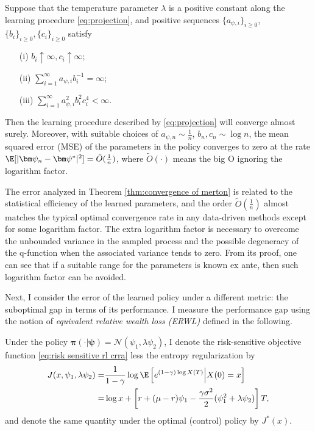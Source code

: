 \begin{theorem}
	\label{thm:convergence of merton}
	Suppose that the temperature parameter $\lambda$ is a positive constant along the learning procedure \eqref{eq:projection}, and positive sequences $\{a_{\psi,i}\}_{i\geq 0}$, $\{b_i\}_{i\geq 0},\{c_i\}_{i\geq 0}$ satisfy
	\begin{enumerate}
		\item[(i)] $b_{i}\uparrow \infty,c_i\uparrow \infty$;
		\item[(ii)] $\sum_{i=1}^{\infty}a_{\psi,i}b_i^{-1} = \infty$;
		\item[(iii)] $\sum_{i=1}^{\infty}a_{\psi,i}^2  b_i^{2}  c_i^4  < \infty$.
	\end{enumerate}
	Then the learning procedure described by \eqref{eq:projection} will converge almost surely. Moreover, with suitable choices of $a_{\psi,n} \sim \frac{1}{n}$, $b_n,c_n \sim \log n$, the mean squared error (MSE) of the parameters in the policy converges to zero at the rate $\E[|\bm \psi_{n} - \bm\psi^*|^2] =\tilde{O}(\frac{1}{n})$, where $\tilde{O}(\cdot)$ means the big O ignoring the logarithm factor.
\end{theorem}

The error analyzed in Theorem \ref{thm:convergence of merton} is related to the statistical efficiency of the learned parameters, and the order $\tilde{O}(\frac{1}{n})$ almost matches the typical optimal convergence rate in any data-driven methods except for some logarithm factor. The extra logarithm factor is necessary to overcome the unbounded variance in the sampled process and the possible degeneracy of the q-function when the associated variance tends to zero. From its proof, one can see that if a suitable range for the parameters is known ex ante, then such logarithm factor can be avoided.


Next, I consider the error of the learned policy under a different metric: the suboptimal gap in terms of its performance. I measure the performance gap using the notion of \textit{equivalent relative wealth loss (ERWL)} defined in the following.

Under the policy $\bm\pi(\cdot|\bm\psi)= \mathcal{N}( \psi_1, \lambda \psi_2)$, I denote the risk-sensitive objective function \eqref{eq:risk sensitive rl crra} less the entropy regularization by
\begin{equation}
	\label{eq:risk sensitive objective merton explicit}
	\begin{aligned}
		J(x,\psi_1,\lambda \psi_2) = & \frac{1}{1-\gamma}\log\E\left[ e^{(1-\gamma) \log X(T) }\Big| X(0) = x \right] \\
		= & \log x + \left[ r + (\mu-r)\psi_1 - \frac{\gamma \sigma^2}{2}(\psi_1^2 + \lambda \psi_2) \right]T ,
	\end{aligned} 
\end{equation}
and denote the same quantity under the optimal (control) policy by $J^*(x)$.

